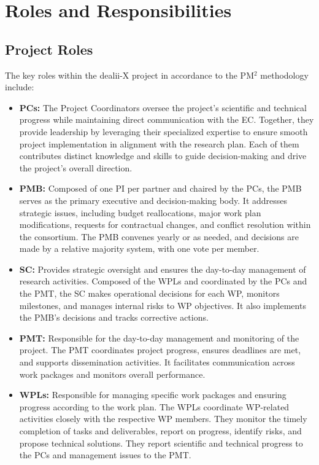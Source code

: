 \documentclass[a4paper,12pt]{article}
\begin{document}
\section{\textcolor{EUblue}{Roles and Responsibilities}}
\label{sec:roles_responsabilities}

\subsection{\textcolor{EUblue}{Project Roles}}
The key roles within the dealii-X project in accordance to the PM$^2$ methodology include:
\begin{itemize}[left=2em, itemsep=1pt, topsep=0pt] 
    \item \textbf{PCs:} The Project Coordinators oversee the project's scientific and technical progress while maintaining direct communication with the EC. Together, they provide leadership by leveraging their specialized expertise to ensure smooth project implementation in alignment with the research plan. Each of them contributes distinct knowledge and skills to guide decision-making and drive the project's overall direction.
    \item \textbf{PMB:} Composed of one PI per partner and chaired by the PCs, the PMB serves as the primary executive and decision-making body. It addresses strategic issues, including budget reallocations, major work plan modifications, requests for contractual changes, and conflict resolution within the consortium. The PMB convenes yearly or as needed, and decisions are made by a relative majority system, with one vote per member.
    \item \textbf{SC:} Provides strategic oversight and ensures the day-to-day management of research activities. Composed of the WPLs and coordinated by the PCs and the PMT, the SC makes operational decisions for each WP, monitors milestones, and manages internal risks to WP objectives. It also implements the PMB's decisions and tracks corrective actions.
    \item \textbf{PMT:} Responsible for the day-to-day management and monitoring of the pro\-ject. The PMT coordinates project progress, ensures deadlines are met, and supports dissemination activities. It facilitates communication across work packages and monitors overall performance.
    \item \textbf{WPLs:} Responsible for managing specific work packages and ensuring pro\-gress according to the work plan. The WPLs coordinate WP-related activities closely with the respective WP members. They monitor the timely completion of tasks and deliverables, report on progress, identify risks, and propose technical solutions. They report scientific and technical progress to the PCs and management issues to the PMT.
\end{itemize}
\end{document}
